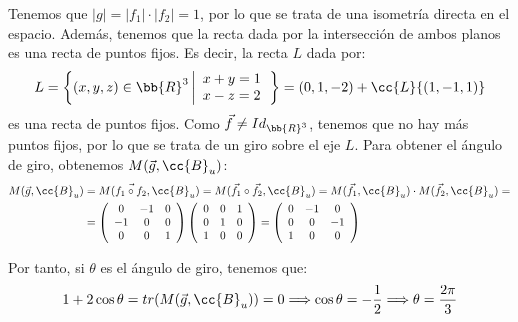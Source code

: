 \begin{ejercicio}
\begin{enumerate}
        Tenemos que $|g| = |f_1|\cdot |f_2| = 1$, por lo que se trata de una isometría directa en el espacio. Además, tenemos que la recta dada por la intersección de ambos planos es una recta de puntos fijos. Es decir, la recta $L$ dada por:
        \begin{equation*}
            L = \left\{(x,y,z)\in \bb{R}^3 \left|\begin{array}{l}
                x+y=1\\
                x-z=2
            \end{array}\right.\right\} = (0, 1, -2) + \cc{L}\{(1,-1,1)\}
        \end{equation*}
        es una recta de puntos fijos. Como $\vec{f}\neq Id_{\bb{R}^3}$, tenemos que no hay más puntos fijos, por lo que se trata de un giro sobre el eje $L$. Para obtener el ángulo de giro, obtenemos $M(\vec{g},\cc{B}_u)$:
        \begin{equation*}
            \begin{split}
                M(\vec{g},\cc{B}_u) &= M(\vec{f_1\circ f_2},\cc{B}_u) = M(\vec{f_1}\circ \vec{f_2},\cc{B}_u) = M(\vec{f_1},\cc{B}_u)\cdot M(\vec{f_2},\cc{B}_u) =\\
                &= \left(
                \begin{array}{ccc}
                    0 & -1 & 0 \\
                    -1 & 0 & 0 \\
                    0 & 0 & 1
                \end{array}
                \right)
                \left(
                \begin{array}{ccc}
                    0 & 0 & 1 \\
                    0 & 1 & 0 \\
                    1 & 0 & 0
                \end{array}
                \right)
                = \left(
                \begin{array}{ccc}
                    0 & -1 & 0 \\
                    0 & 0 & -1 \\
                    1 & 0 & 0
                \end{array}
                \right)
            \end{split}
        \end{equation*}

        Por tanto, si $\theta$ es el ángulo de giro, tenemos que:
        \begin{equation*}
             1+2\cos\theta = tr(M(\vec{g}, \cc{B}_u)) = 0\Longrightarrow \cos\theta = -\frac{1}{2} \Longrightarrow \theta = \frac{2\pi}{3}
        \end{equation*}
    \end{enumerate}
\end{ejercicio}

